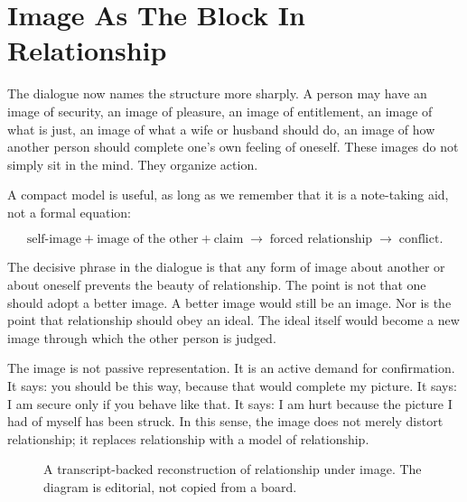\section{Image As The Block In Relationship}

The dialogue now names the structure more sharply. A person may have an image of security, an image of pleasure, an image of entitlement, an image of what is just, an image of what a wife or husband should do, an image of how another person should complete one's own feeling of oneself. These images do not simply sit in the mind. They organize action.

A compact model is useful, as long as we remember that it is a note-taking aid, not a formal equation:

\begin{equation}
\text{self-image}
+
\text{image of the other}
+
\text{claim}
\;\longrightarrow\;
\text{forced relationship}
\;\longrightarrow\;
\text{conflict}.
\end{equation}

The decisive phrase in the dialogue is that any form of image about another or about oneself prevents the beauty of relationship. The point is not that one should adopt a better image. A better image would still be an image. Nor is the point that relationship should obey an ideal. The ideal itself would become a new image through which the other person is judged.

The image is not passive representation. It is an active demand for confirmation. It says: you should be this way, because that would complete my picture. It says: I am secure only if you behave like that. It says: I am hurt because the picture I had of myself has been struck. In this sense, the image does not merely distort relationship; it replaces relationship with a model of relationship.

\begin{figure}
\centering
{}
\caption{A transcript-backed reconstruction of relationship under image. The diagram is editorial, not copied from a board.}
\end{figure}

